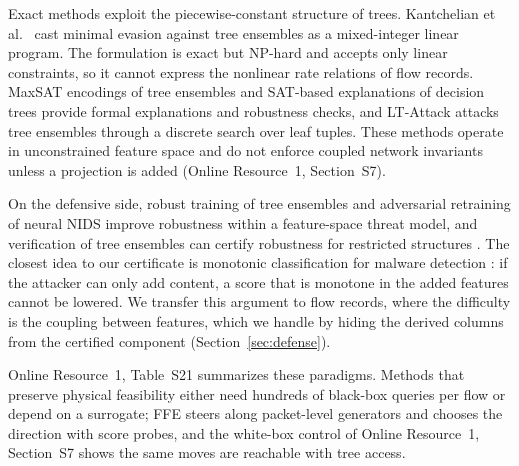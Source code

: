 Exact methods exploit the piecewise-constant structure of trees. Kantchelian et al.~\cite{kantchelian2016evasion} cast minimal evasion against tree ensembles as a mixed-integer linear program. The formulation is exact but NP-hard and accepts only linear constraints, so it cannot express the nonlinear rate relations of flow records. MaxSAT encodings of tree ensembles \cite{ignatiev2022formal} and SAT-based explanations of decision trees \cite{izza2022tackling} provide formal explanations and robustness checks, and LT-Attack \cite{zhang2020efficient} attacks tree ensembles through a discrete search over leaf tuples. These methods operate in unconstrained feature space and do not enforce coupled network invariants unless a projection is added (Online Resource~1, Section~S7).

On the defensive side, robust training of tree ensembles \cite{chen2019robust, andriushchenko2019provably, calzavara2020treant, vos2021efficient} and adversarial retraining of neural NIDS \cite{hashemi2020enhancing} improve robustness within a feature-space threat model, and verification of tree ensembles can certify robustness for restricted structures \cite{calzavara2023verifiable, calzavara2025verifiableboosted}. The closest idea to our certificate is monotonic classification for malware detection \cite{incer2018adversarially}: if the attacker can only add content, a score that is monotone in the added features cannot be lowered. We transfer this argument to flow records, where the difficulty is the coupling between features, which we handle by hiding the derived columns from the certified component (Section~\ref{sec:defense}).

Online Resource~1, Table~S21 summarizes these paradigms. Methods that preserve physical feasibility either need hundreds of black-box queries per flow or depend on a surrogate; FFE steers along packet-level generators and chooses the direction with score probes, and the white-box control of Online Resource~1, Section~S7 shows the same moves are reachable with tree access.
